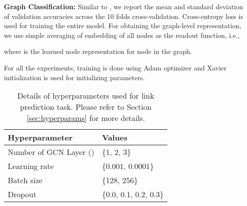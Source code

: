 \documentclass{article} \usepackage{iclr2020_conference,times}
\begin{document}
\noindent \textbf{Graph Classification:} Similar to \cite{graph_datasets,gin}, we report the mean and standard deviation of validation accuracies across the 10 folds cross-validation. Cross-entropy loss is used for training the entire model. For obtaining the graph-level representation, we use simple averaging of embedding of all nodes as the readout function, i.e.,


where  is the learned node representation for node  in the graph. 


For all the experiments, training is done using Adam optimizer \citep{adam_opt} and Xavier initialization \citep{xavier_init} is used for initializing parameters.
	
\begin{table}[h]
	\centering
	\small
	\begin{tabular}{ll}
		\toprule
		Hyperparameter                 & Values 					\\
		\midrule
		Number of GCN Layer () & \{1, 2, 3\}			\\
		Learning rate                  & \{0.001, 0.0001\}			\\
		Batch size                     & \{128, 256\}			\\
		Dropout  & \{0.0, 0.1, 0.2, 0.3\}		\\
		\bottomrule
	\end{tabular}
	\caption{Details of hyperparameters used for link prediction task. Please refer to Section \ref{sec:hyperparams} for more details.}
	\label{table:hyperparams}
\end{table}
 
\end{document}
